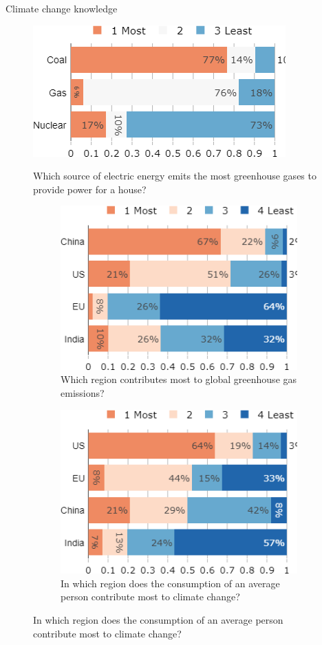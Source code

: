 \documentclass[aspectratio=169,9pt,dvipsnames]{beamer}
\begin{document}
\begin{frame}{Climate change knowledge}%
\begin{figure}[h!]
\centering
\caption{Which source of electric energy emits the most greenhouse gases to provide power for a house?}
\includegraphics[width=.3\textwidth]{../figures/DK/footprint_elec_DK.png} \\
\end{figure}
\begin{figure}[h!]
\centering
\begin{subfigure}[b]{0.49\textwidth}
\centering
\caption{Which region contributes most to global greenhouse gas emissions?} %
\includegraphics[width=.75\textwidth]{../figures/DK/footprint_region_no_miss_DK.png}
\end{subfigure}
\hfill
\begin{subfigure}[b]{0.49\textwidth}
\centering
\caption{In which region does the consumption of an average person contribute most to climate change?} %
\includegraphics[width=.75\textwidth]{../figures/DK/footprint_pc_no_miss_DK.png}
\end{subfigure}
\end{figure}
\end{frame}
\end{document}
